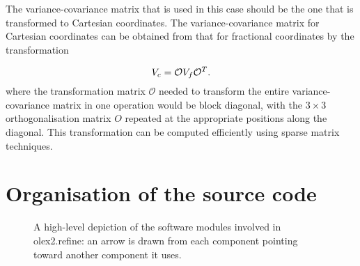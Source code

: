\documentclass[pdf]{iucr}
\begin{document}
The variance-covariance matrix that is used in this case should be the one that is transformed to Cartesian coordinates. The variance-covariance matrix for Cartesian coordinates can be obtained from that for fractional coordinates by the transformation

\begin{equation}
V_{c} = \mathcal{O} V_{f} \mathcal{O}^{T}.
\label{eqn:vcv_cart}
\end{equation}
where the transformation matrix $\mathcal{O}$ needed to transform the entire variance-covariance matrix in one operation would be block diagonal, with the $3 \times 3$ orthogonalisation matrix $O$ repeated at the appropriate positions along the diagonal. This transformation can be computed efficiently using sparse matrix techniques.


\appendix

\section{Organisation of the source code}
\label{appendix:source:code:organisation}

\begin{figure}
\caption{A high-level depiction of the software modules involved in olex2.refine: an arrow is drawn from each component pointing toward another component it uses.}
\label{fig:software:modules}
\end{figure}
\end{document}
